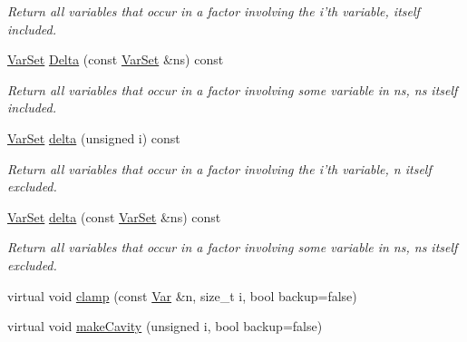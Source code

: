 \begin{CompactItemize}
\begin{CompactList}\small\item\em Return all variables that occur in a factor involving the i'th variable, itself included. \item\end{CompactList}\item 
\hypertarget{classdai_1_1FactorGraph_6c74472eacbfc029cc6cc5ba4e865b1d}{
\hyperlink{classdai_1_1VarSet}{VarSet} \hyperlink{classdai_1_1FactorGraph_6c74472eacbfc029cc6cc5ba4e865b1d}{Delta} (const \hyperlink{classdai_1_1VarSet}{VarSet} \&ns) const }
\label{classdai_1_1FactorGraph_6c74472eacbfc029cc6cc5ba4e865b1d}

\begin{CompactList}\small\item\em Return all variables that occur in a factor involving some variable in ns, ns itself included. \item\end{CompactList}\item 
\hypertarget{classdai_1_1FactorGraph_bd749cf993fdc774b993e72d7d07bc40}{
\hyperlink{classdai_1_1VarSet}{VarSet} \hyperlink{classdai_1_1FactorGraph_bd749cf993fdc774b993e72d7d07bc40}{delta} (unsigned i) const }
\label{classdai_1_1FactorGraph_bd749cf993fdc774b993e72d7d07bc40}

\begin{CompactList}\small\item\em Return all variables that occur in a factor involving the i'th variable, n itself excluded. \item\end{CompactList}\item 
\hypertarget{classdai_1_1FactorGraph_358d94bc2adb7be856ea7b60e2e21096}{
\hyperlink{classdai_1_1VarSet}{VarSet} \hyperlink{classdai_1_1FactorGraph_358d94bc2adb7be856ea7b60e2e21096}{delta} (const \hyperlink{classdai_1_1VarSet}{VarSet} \&ns) const }
\label{classdai_1_1FactorGraph_358d94bc2adb7be856ea7b60e2e21096}

\begin{CompactList}\small\item\em Return all variables that occur in a factor involving some variable in ns, ns itself excluded. \item\end{CompactList}\item 
virtual void \hyperlink{classdai_1_1FactorGraph_3cb7d91ca96090372bd0aacbf70a8948}{clamp} (const \hyperlink{classdai_1_1Var}{Var} \&n, size\_\-t i, bool backup=false)
\item 
\hypertarget{classdai_1_1FactorGraph_42791a748401710f846e3ac1a3d7a10a}{
virtual void \hyperlink{classdai_1_1FactorGraph_42791a748401710f846e3ac1a3d7a10a}{makeCavity} (unsigned i, bool backup=false)}
\label{classdai_1_1FactorGraph_42791a748401710f846e3ac1a3d7a10a}


\end{CompactItemize}
